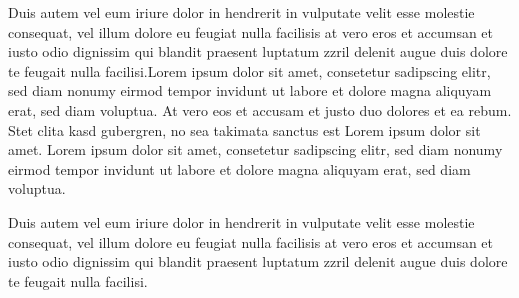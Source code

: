 Duis autem vel eum iriure dolor in hendrerit in vulputate velit esse molestie consequat, vel illum dolore eu feugiat nulla facilisis at vero eros et accumsan et iusto odio dignissim qui blandit praesent luptatum zzril delenit augue duis dolore te feugait nulla facilisi.Lorem ipsum dolor sit amet, consetetur sadipscing elitr, sed diam nonumy eirmod tempor invidunt ut labore et dolore magna aliquyam erat, sed diam voluptua. At vero eos et accusam et justo duo dolores et ea rebum. Stet clita kasd gubergren, no sea takimata sanctus est Lorem ipsum dolor sit amet. Lorem ipsum dolor sit amet, consetetur sadipscing elitr, sed diam nonumy eirmod tempor invidunt ut labore et dolore magna aliquyam erat, sed diam voluptua.

Duis autem vel eum iriure dolor in hendrerit in vulputate velit esse molestie consequat, vel illum dolore eu feugiat nulla facilisis at vero eros et accumsan et iusto odio dignissim qui blandit praesent luptatum zzril delenit augue duis dolore te feugait nulla facilisi.